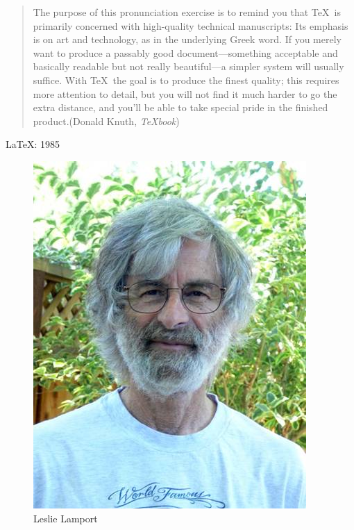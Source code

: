 \documentclass[final]{beamer}
\begin{document}
\begin{frame}
  \Huge
\end{frame}

\begin{frame}
  \large
  \begin{quote}
    The purpose of this pronunciation exercise is to remind you that \TeX\ is
    primarily concerned with high-quality technical manuscripts: Its emphasis
    is on art and technology, as in the underlying Greek word. If you merely
    want to produce a passably good document—something acceptable and basically
    readable but not really beautiful—a simpler system will usually suffice.
    With \TeX\ the goal is to produce the finest quality; this requires more
    attention to detail, but you will not find it much harder to go the extra
    distance, and you’ll be able to take special pride in the finished
    product.\hfill (Donald Knuth, \emph{\TeX book})
  \end{quote}
\end{frame}

\begin{frame}
  \Huge
  \LaTeX: 1985
\end{frame}

\begin{frame}[plain]
  \begin{figure}[h]
    \includegraphics[scale=.5]{imagens/lamport}
    \caption{Leslie Lamport}
  \end{figure}
\end{frame}
\end{document}
